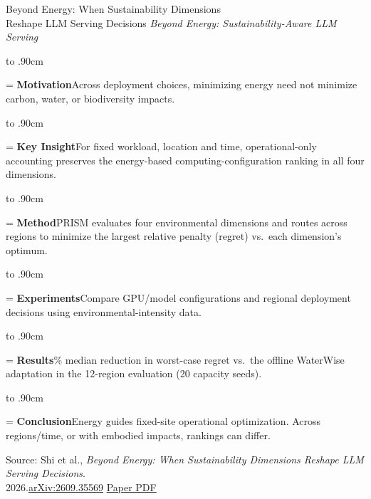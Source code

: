 \documentclass[aspectratio=169,10pt]{beamer}
\newcommand{\point}[2]{\par\vbox to .90cm{\hsize=\linewidth
\textbf{\color{Accent}#1}\quad #2\par\vfil}}
\newcommand{\meta}[1]{{\small\color{Muted}\textit{#1}}\par\medskip}
\newcommand{\src}[1]{\par\vfill{\scriptsize\color{Muted}Source: #1\par}}
\begin{document}
\begin{frame}[t]{Beyond Energy: When Sustainability Dimensions\\Reshape LLM Serving Decisions}
\meta{Beyond Energy: Sustainability-Aware LLM Serving}
\point{Motivation}{Across deployment choices, minimizing energy need not minimize carbon, water, or biodiversity impacts.}
\point{Key Insight}{For fixed workload, location and time, operational-only accounting preserves the energy-based computing-configuration ranking in all four dimensions.}
\point{Method}{PRISM evaluates four environmental dimensions and routes across regions to minimize the largest relative penalty (regret) vs.\ each dimension's optimum.}
\point{Experiments}{Compare GPU/model configurations and regional deployment decisions using environmental-intensity data.}
\point{Results}{50.2\% median reduction in worst-case regret vs.\ the offline WaterWise adaptation in the 12-region evaluation (20 capacity seeds).}
\point{Conclusion}{Energy guides fixed-site operational optimization. Across regions/time, or with embodied impacts, rankings can differ.}
\src{Shi et al., \textit{Beyond Energy: When Sustainability Dimensions Reshape LLM Serving Decisions}.\\
2026.\quad \href{https://arxiv.org/abs/2609.35569}{arXiv:2609.35569}\quad
\href{https://arxiv.org/pdf/2609.35569}{Paper PDF}}
\end{frame}
\end{document}
